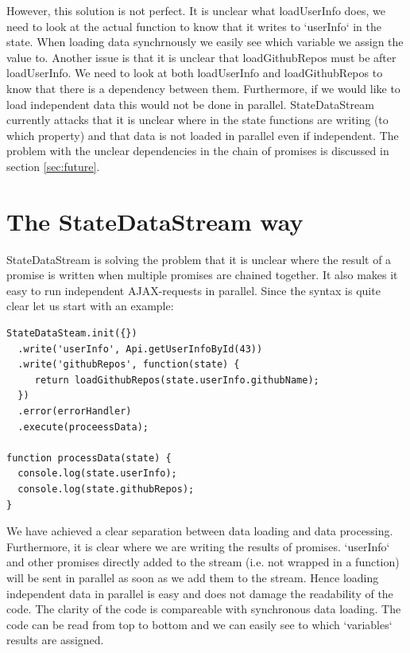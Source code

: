 \documentclass[a4paper,12pt]{article}
\begin{document}
However, this solution is not perfect. It is unclear what loadUserInfo does, we need to look at the actual function to know that it writes to `userInfo` in the state. When loading data
synchrnously we easily see which variable we assign the value to. Another issue is that it is unclear that loadGithubRepos must be after loadUserInfo. We need to look at both loadUserInfo and loadGithubRepos to know that there
is a dependency between them. Furthermore, if we would like to load independent data this would not be done in parallel. 
StateDataStream currently attacks that it is unclear where in the state functions are writing (to which property) and that data is not loaded in parallel even if independent.
The problem with the unclear dependencies in the chain of promises is discussed in section \ref{sec:future}.

\clearpage

\section{The StateDataStream way}
StateDataStream is solving the problem that it is unclear where the result of a promise is written when multiple promises are chained together. 
It also makes it easy to run independent AJAX-requests in parallel. Since the syntax is quite clear let us start with an example:

\begin{lstlisting}[caption={Code showing how two pieces of data, where the second is dependent on the first, can be loaded using StateDataStream.}, frame=single]
StateDataSteam.init({})
  .write('userInfo', Api.getUserInfoById(43))
  .write('githubRepos', function(state) {
     return loadGithubRepos(state.userInfo.githubName);
  })
  .error(errorHandler)
  .execute(proceessData);

function processData(state) {
  console.log(state.userInfo);
  console.log(state.githubRepos);
}
\end{lstlisting}
We have achieved a clear separation between data loading and data processing. Furthermore, it is clear where we are writing the results of promises. `userInfo` and other promises directly added to the stream (i.e. not wrapped in a function) will be sent in parallel as soon as we add them to the stream. Hence loading independent data in parallel is easy and does not damage the readability of the code.
The clarity of the code is compareable with synchronous data loading. The code can be read from top to bottom and we can easily see to which `variables` results are assigned.
\end{document}
